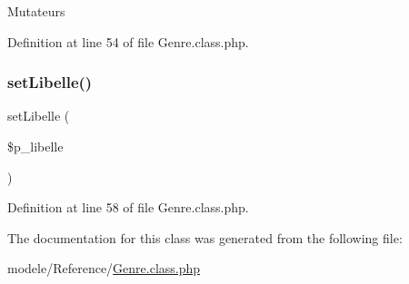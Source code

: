 Mutateurs 

Definition at line 54 of file Genre.\+class.\+php.

\mbox{\label{class_genre_a66db92fb0941d80c8abb47511455f856}} 
\subsubsection{\texorpdfstring{set\+Libelle()}{setLibelle()}}
{\footnotesize\ttfamily set\+Libelle (\begin{DoxyParamCaption}\item[{}]{\$p\+\_\+libelle }\end{DoxyParamCaption})}



Definition at line 58 of file Genre.\+class.\+php.



The documentation for this class was generated from the following file\+:\begin{DoxyCompactItemize}
\item 
modele/\+Reference/\hyperlink{_genre_8class_8php}{Genre.\+class.\+php}\end{DoxyCompactItemize}

